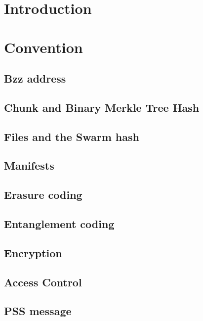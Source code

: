\chapter{Introduction}


\chapter{Convention}\label{spec:convention}
\section{Bzz address}\label{spec:format:bzzaddress}

\section{Chunk and Binary Merkle Tree Hash}\label{spec:format:bmt}

\section{Files and the Swarm hash}\label{spec:format:files}

\section{Manifests}\label{spec:format:manifests}

\section{Erasure coding}\label{spec:format:erasure}

\section{Entanglement coding}\label{spec:format:entanglements}
%
\section{Encryption}\label{spec:format:encryption}

\section{Access Control}\label{spec:format:access-control}

\section{PSS message}\label{spec:format:pss-messsage}

